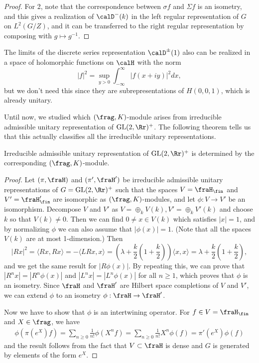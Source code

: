 \begin{proof}
For 2, note that the correspondence between $\sigma f$ and $\Sigma f$ is an isometry, and this gives a realization of $\calD^{-}(k)$ in the left regular representation of $G$ on $L^{2}(G/Z)$, and it can be transferred to the right regular representation by composing with $g\mapsto g^{-1}$. 
\end{proof}

The limits of the discrete series representation $\calD^{\pm}(1)$ also can be realized in a space of holomorphic functions on $\calH$ with the norm 
$$
|f|^{2} = \sup_{y>0}  \int_{-\infty}^{\infty} |f(x+iy)|^{2} dx,
$$
but we don't need this since they are subrepresentations of $H(0, 0, 1)$, which is already unitary. 

Until now, we studied which $(\frag, K)$-module arises from irreducible admissible unitary representation of $\GL(2, \Rr)^{+}$. The following theorem tells us that this actually classifies all the irreducible unitary representations. 
\begin{theorem}
\label{unigk}
Irreducible admissible unitary representation of $\GL(2, \Rr)^{+}$ is determined by the corresponding $(\frag, K)$-module. 
\end{theorem}
\begin{proof}
Let $(\pi, \fraH)$ and $(\pi', \fraH')$ be irreducible admissible unitary representations of $G = \GL(2, \Rr)^{+}$ such that the spaces $V = \fraH_{\fin}$ and $V' = \fraH_{\fin}'$ are isomorphic as $(\frag, K)$-modules, and let $\phi:V\to V'$ be an isomorphism. 
Decompose $V$ and $V'$ as $V = \oplus_{k} V(k), V' = \oplus_{k} V'(k)$ and choose $k$ so that $V(k)\neq 0$. 
Then we can find $0\neq x\in V(k)$ which satisfies $|x| = 1$, and by normalizing $\phi$ we can also assume that $|\phi(x)| = 1$. (Note that all the spaces $V(k)$ are at most 1-dimension.) 
Then 
$$
|Rx|^{2} = \langle Rx, Rx\rangle = -\langle LRx, x\rangle = \left(\lambda + \frac{k}{2}\left(1+\frac{k}{2}\right)\right) \langle x, x\rangle = \lambda + \frac{k}{2}\left(1+\frac{k}{2}\right), 
$$
and we get the same result for $|R\phi(x)|$. By repeating this, we can prove that $|R^{n}x| = |R^{n}\phi(x)|$ and $|L^{n}x| = |L^{n}\phi(x)|$ for all $n\geq 1$, which proves that $\phi$ is an isometry. Since $\fraH$ and $\fraH'$ are Hilbert space completions of $V$ and $V'$, we can extend $\phi$ to an isometry $\phi:\fraH\to \fraH'$. 

Now we have to show that $\phi$ is an intertwining operator. For $f\in V = \fraH_{\fin}$ and $X\in \frag$, we have
\begin{align*}
\phi(\pi(e^{X})f) = \sum_{n\geq 0} \frac{1}{n!} \phi(X^{n}f) = \sum_{n\geq 0} \frac{1}{n!}X^{n}\phi(f) = \pi'(e^{X})\phi(f)
\end{align*}
and the result follows from the fact that $V\subset \fraH$ is dense and $G$ is generated by elements of the form $e^{X}$. 
\end{proof}

